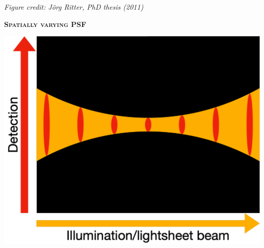 \documentclass[a0paper,portrait,fontscale=0.35]{baposter}
\newcommand{\mycaption}[1]{
  {
    \smaller
    \emph{#1}
  }
}
\theoremstyle{plain}
\theoremstyle{plain}
\theoremstyle{definition}
\theoremstyle{plain}
\theoremstyle{definition}
\begin{document}
\begin{poster}
{\begin{minipage}[t]{0.48\textwidth}
    \mycaption{Figure credit: J\"{o}rg Ritter, PhD thesis (2011)}
  \end{minipage}
  \begin{minipage}[t]{0.48\textwidth}
    \begin{center}
      \larger
      {\color{blue}\textbf{\textsc{Spatially varying PSF}}}\\
    \end{center}
    
    \begin{minipage}[t]{\textwidth}
      \centering
      \includegraphics[width=\textwidth]{img/psf_vary.pdf}
    \end{minipage}
  \end{minipage}
     
}
\end{poster}
\end{document}
